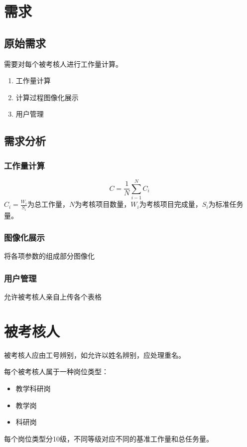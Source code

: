 \documentclass[UTF8,fontset=windowsnew]{ctexart}
\begin{document}
\songti

\section{需求}
\subsection{原始需求}
需要对每个被考核人进行工作量计算。
\begin{enumerate}
    \item 工作量计算
    \item 计算过程图像化展示
    \item 用户管理
\end{enumerate}
\subsection{需求分析}
\subsubsection{工作量计算}
\begin{equation}
  C=\frac{1}{N}\sum_{i-1}^NC_i\label{eq:main}
\end{equation}
$C_i=\frac{W_i}{S_i}$为总工作量，$N$为考核项目数量，$W_i$为考核项目完成量，$S_i$为标准任务量。\par
\subsubsection{图像化展示}
将各项参数的组成部分图像化
\subsubsection{用户管理}
允许被考核人亲自上传各个表格
\section{被考核人}
被考核人应由工号辨别，如允许以姓名辨别，应处理重名。\par
每个被考核人属于一种岗位类型：\par
\begin{itemize}
  \item 教学科研岗
  \item 教学岗
  \item 科研岗
\end{itemize}
每个岗位类型分10级，不同等级对应不同的基准工作量和总任务量。
\end{document}
